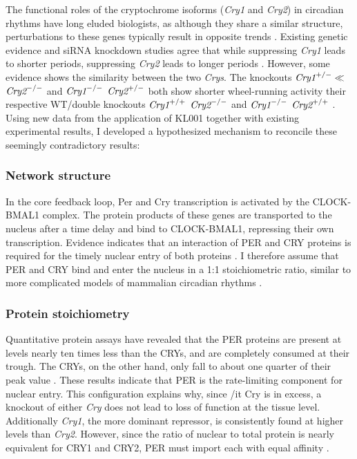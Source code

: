 The functional roles of the cryptochrome isoforms ({\it Cry1} and {\it Cry2}) in circadian rhythms have long eluded biologists, as although they share a similar structure, perturbations to these genes typically result in opposite trends \cite{McCarthy2009}.
Existing genetic evidence and siRNA knockdown studies agree that while suppressing {\it Cry1} leads to shorter periods, suppressing {\it Cry2} leads to longer periods \cite{VanderHorst1999, Zhang2009}.
However, some evidence shows the similarity between the two {\it Crys}.
The knockouts $\text{\it Cry1}^{+/-}\ll$ $\text{\it Cry2}^{-/-}$ and $\text{\it Cry1}^{-/-}$ $\text{\it Cry2}^{+/-}$ both show shorter wheel-running activity their respective WT/double knockouts $\text{\it Cry1}^{+/+}$ $\text{\it Cry2}^{-/-}$ and $\text{\it Cry1}^{-/-}$ $\text{\it Cry2}^{+/+}$ \cite{VanderHorst1999}.
Using new data from the application of KL001 together with existing experimental results, I developed a hypothesized mechanism to reconcile these seemingly contradictory results:

\subsubsection{Network structure}
In the core feedback loop, Per and Cry transcription is activated by the CLOCK-BMAL1 complex.
The protein products of these genes are transported to the nucleus after a time delay and bind to CLOCK-BMAL1, repressing their own transcription.
Evidence indicates that an interaction of PER and CRY proteins is required for the timely nuclear entry of both proteins \cite{Miyazaki2001,Ko2006,Kume1999}.
I therefore assume that PER and CRY bind and enter the nucleus in a 1:1 stoichiometric ratio, similar to more complicated models of mammalian circadian rhythms \cite{Leloup2003,Mirsky2009,Forger2003}.

\subsubsection{Protein stoichiometry}
Quantitative protein assays have revealed that the PER proteins are present at levels nearly ten times less than the CRYs, and are completely consumed at their trough.
The CRYs, on the other hand, only fall to about one quarter of their peak value  \cite{Lee2001}.
These results indicate that PER is the rate-limiting component for nuclear entry.
This configuration explains why, since {/it Cry} is in excess, a knockout of either {\it Cry} does not lead to loss of function at the tissue level.
Additionally {\it Cry1}, the more dominant repressor, is consistently found at higher levels than {\it Cry2}.
However, since the ratio of nuclear to total protein is nearly equivalent for CRY1 and CRY2, PER must import each with equal affinity \cite{Lee2001,Lee2011b}.

